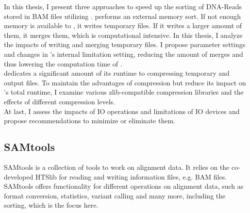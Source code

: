 In this thesis, I present three approaches to speed up the sorting of DNA-Reads stored in BAM files utilizing \sort. \sort performs an external memory sort. If not enough memory is available to \sort, it writes temporary files. If it writes a larger amount of them, it merges them, which is computational intensive. In this thesis, I analyze the impacts of \sort writing and merging temporary files. I propose parameter settings and changes in \sort's internal limitation setting, reducing the amount of merges and thus lowering the computation time of \sort. \\

\sort dedicates a significant amount of its runtime to compressing temporary and output files. To maintain the advantages of compression but reduce its impact on \sort's total runtime, I examine various zlib-compatible compression libraries and the effects of different compression levels. \\

At last, I assess the impacts of IO operations and limitations of IO devices and propose recommendations to minimize or eliminate them.



\subsection{SAMtools}
SAMtools \cite{12ySamtools} is a collection of tools to work on alignment data. It relies on the co-developed HTSlib \cite{bonfield_htslib_2021} for reading and writing information files, e.g. BAM files. SAMtools offers functionality for different operations on alignment data, such as format conversion, statistics, variant calling and many more, including the sorting, which is the focus here.

